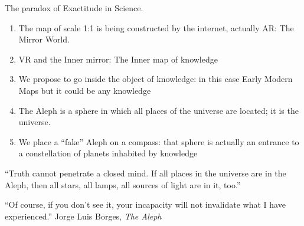 \documentclass{beamer}
\begin{document}
\begin{frame}{The paradox of Exactitude in Science.}
	\begin{enumerate}
		\item The map of scale 1:1 is being constructed by the internet, 
			actually AR: The Mirror World.
		\item VR and the Inner mirror: The Inner map of knowledge
		\item We propose to go inside the object of knowledge: in this case Early Modern Maps but it could be any knowledge
		\item The Aleph is a sphere in which all places of the universe are located; 
			it is the universe.
		\item We place a ``fake'' Aleph on a compass:  that sphere is actually an entrance to a constellation of planets inhabited by knowledge
	\end{enumerate}
\end{frame}
\begin{frame}
	``Truth cannot penetrate a closed mind. If all places in the universe are in the Aleph, then all stars, all lamps, all sources of light are in it, too.''\par

	\vskip 1cm
	``Of course, if you don't see it, your incapacity will not invalidate what I have experienced.''
	\vskip 1cm
	\hfill Jorge Luis Borges, \textit{The Aleph}\par
\end{frame}
\end{document}
